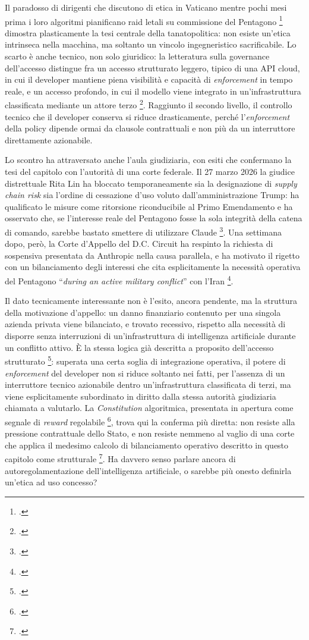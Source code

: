 \documentclass[a4paper,12pt]{report}
\begin{document}
Il paradosso di dirigenti che discutono di etica in Vaticano mentre pochi mesi
prima i loro algoritmi pianificano raid letali su commissione del Pentagono
\footcite{ruzic_2026} dimostra plasticamente la tesi centrale della
tanatopolitica: non esiste un'etica intrinseca nella macchina, ma soltanto un
vincolo ingegneristico sacrificabile. Lo scarto è anche tecnico, non solo
giuridico: la letteratura sulla governance dell'accesso distingue fra un accesso
strutturato leggero, tipico di una API cloud, in cui il developer mantiene piena
visibilità e capacità di \textit{enforcement} in tempo reale, e un accesso
profondo, in cui il modello viene integrato in un'infrastruttura classificata
mediante un attore terzo \footcite{shevlane_2022_access}. Raggiunto il secondo
livello, il controllo tecnico che il developer conserva si riduce drasticamente,
perché l'\textit{enforcement} della policy dipende ormai da clausole contrattuali
e non più da un interruttore direttamente azionabile.

Lo scontro ha attraversato anche l'aula giudiziaria, con esiti che confermano la
tesi del capitolo con l'autorità di una corte federale. Il 27 marzo 2026 la
giudice distrettuale Rita Lin ha bloccato temporaneamente sia la designazione di
\textit{supply chain risk} sia l'ordine di cessazione d'uso voluto
dall'amministrazione Trump: ha qualificato le misure come ritorsione riconducibile
al Primo Emendamento e ha osservato che, se l'interesse reale del Pentagono fosse
la sola integrità della catena di comando, sarebbe bastato smettere di utilizzare
Claude \footcite{thehill_2026_lin}. Una settimana dopo, però, la Corte d'Appello
del D.C. Circuit ha respinto la richiesta di sospensiva presentata da Anthropic
nella causa parallela, e ha motivato il rigetto con un bilanciamento degli
interessi che cita esplicitamente la necessità operativa del Pentagono
``\textit{during an active military conflict}'' con l'Iran
\footcite{thehill_2026_appello}.

Il dato tecnicamente interessante non è l'esito, ancora pendente, ma la struttura
della motivazione d'appello: un danno finanziario contenuto per una singola
azienda privata viene bilanciato, e trovato recessivo, rispetto alla necessità di
disporre senza interruzioni di un'infrastruttura di intelligenza artificiale
durante un conflitto attivo. È la stessa logica già descritta a proposito
dell'accesso strutturato \footcite{shevlane_2022_access}: superata una certa
soglia di integrazione operativa, il potere di \textit{enforcement} del developer
non si riduce soltanto nei fatti, per l'assenza di un interruttore tecnico
azionabile dentro un'infrastruttura classificata di terzi, ma viene esplicitamente
subordinato in diritto dalla stessa autorità giudiziaria chiamata a valutarlo. La
\textit{Constitution} algoritmica, presentata in apertura come segnale di
\textit{reward} regolabile \footcite{bai_2022_cai}, trova qui la conferma più
diretta: non resiste alla pressione contrattuale dello Stato, e non resiste
nemmeno al vaglio di una corte che applica il medesimo calcolo di bilanciamento
operativo descritto in questo capitolo come strutturale
\footcite{leggezero_anthropic_2026}. Ha davvero senso parlare ancora di
autoregolamentazione dell'intelligenza artificiale, o sarebbe più onesto definirla
un'etica ad uso concesso?
\end{document}
